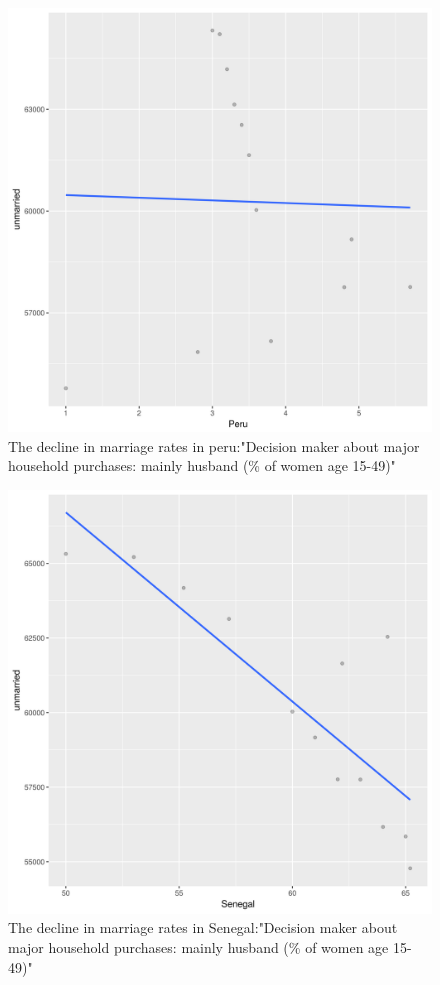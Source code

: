 \documentclass[12pt]{article}
\begin{document}
\begin{figure}[h]
\caption{The decline in marriage rates in peru:"Decision maker about major household purchases: mainly husband (\% of women age 15-49)"}
\centering
\includegraphics[scale=.5]{quest1Peru.png}
\end{figure}
 \clearpage
\begin{figure}[h!]
\caption{The decline in marriage rates in Senegal:"Decision maker about major household purchases: mainly husband (\% of women age 15-49)"}
\centering
\includegraphics[scale=.5]{quest1Senegal.png}
\end{figure}
 \clearpage
\end{document}
